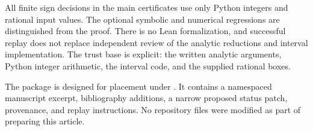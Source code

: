 All finite sign decisions in the main certificates use only Python
integers and rational input values. The optional symbolic and numerical
regressions are distinguished from the proof. There is no Lean
formalization, and successful replay does not replace independent review
of the analytic reductions and interval implementation. The trust base
is explicit: the written analytic arguments, Python integer arithmetic,
the interval code, and the supplied rational boxes.

The package is designed for placement under
.
It contains a namespaced manuscript excerpt, bibliography additions,
a narrow proposed status patch, provenance, and replay instructions.
No repository files were modified as part of preparing this article.

